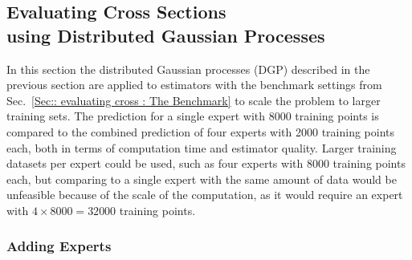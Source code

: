 \documentclass[twoside,english]{uiofysmaster}
\begin{document}
{{%
 


\subsection{Evaluating Cross Sections\\ using Distributed Gaussian Processes}

In this section the distributed Gaussian processes (DGP) described in the previous section are applied to estimators with the benchmark settings from Sec.~\ref{Sec:: evaluating cross : The Benchmark} to scale the problem to larger training sets. The prediction for a single expert with 8000 training points is compared to the combined prediction of four experts with 2000 training points each, both in terms of computation time and estimator quality. Larger training datasets per expert could be used, such as four experts with 8000 training points each, but comparing to a single expert with the same amount of data would be unfeasible because of the scale of the computation, as it would require an expert with $4 \times 8000 = 32 000$ training points.

\subsubsection{Adding Experts}

}}
\end{document}
